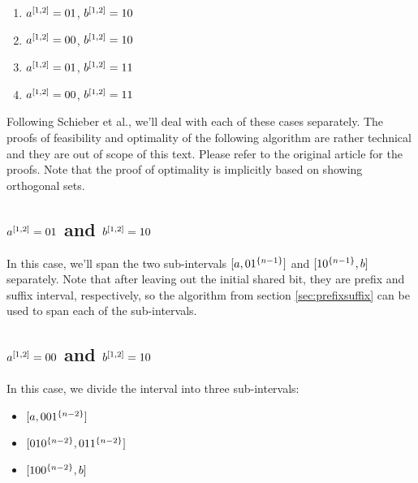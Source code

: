 \begin{enumerate}
\item $a^{[1, 2]} = 01$, $b^{[1, 2]} = 10$
\item $a^{[1, 2]} = 00$, $b^{[1, 2]} = 10$
\item $a^{[1, 2]} = 01$, $b^{[1, 2]} = 11$
\item $a^{[1, 2]} = 00$, $b^{[1, 2]} = 11$
\end{enumerate}

Following Schieber et al.,\cite{Schieber2005154}
we'll deal with each of these cases separately.
The proofs of feasibility and optimality of the following
algorithm are rather technical and they are out of scope
of this text.
Please refer to the original article for the proofs.
Note that the proof of optimality is implicitly based
on showing orthogonal sets.


\subsection{\texorpdfstring
{$a^{[1, 2]} = 01$ and $b^{[1, 2]} = 10$}
{a[1,2] = 01 and b[1,2] = 10}
}

In this case,
we'll span the two sub-intervals
$[a, 0 1^{\{n-1\}}]$
and
$[1 0^{\{n-1\}}, b]$
separately.
Note that after leaving out the initial shared bit,
they are prefix and suffix interval, respectively,
so the algorithm from section \ref{sec:prefixsuffix}
can be used to span each of the sub-intervals.

\subsection{\texorpdfstring
{$a^{[1, 2]} = 00$ and $b^{[1, 2]} = 10$}
{a[1,2] = 00 and b[1,2] = 10}
}
\label{sec:0010}

In this case,
we divide the interval into three sub-intervals:

\begin{itemize}
\item $[a, 00 1^{\{n-2\}}]$
\item $[01 0^{\{n-2\}}, 01 1^{\{n-2\}}]$
\item $[10 0^{\{n-2\}}, b]$
\end{itemize}


